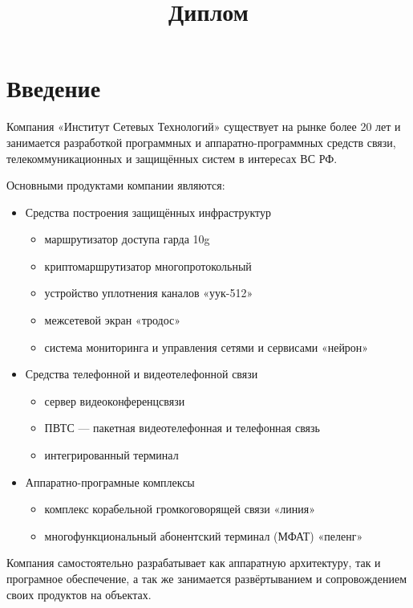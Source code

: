 \documentclass[14pt,a4paper]{extarticle}
\title{Диплом}
\begin{document}
\setcounter{page}{7}

\pagebreak
\tableofcontents

\pagebreak
\section*{Введение}


Компания «Институт Сетевых Технологий» существует на рынке более 20 лет и
занимается разработкой программных и аппаратно-программных средств связи,  телекоммуникационных и защищённых систем в интересах ВС РФ.

Основными продуктами компании являются:
\begin{itemize}
    \item Средства построения защищённых инфраструктур
    \begin{itemize}
        \item маршрутизатор доступа гарда 10g
        \item криптомаршрутизатор многопротокольный
        \item устройство уплотнения каналов «уук-512»
        \item межсетевой экран «тродос»
        \item система мониторинга и управления сетями и сервисами «нейрон»
    \end{itemize}
    \item Средства телефонной и видеотелефонной связи
    \begin{itemize}
        \item сервер видеоконференцсвязи
        \item ПВТС — пакетная видеотелефонная и телефонная связь
        \item интегрированный терминал
    \end{itemize}
    \item Аппаратно-програмные комплексы
    \begin{itemize}
        \item комплекс корабельной громкоговорящей связи «линия»
        \item многофункциональный абонентский терминал (МФАТ) «пеленг»
    \end{itemize}
\end{itemize}

Компания самостоятельно разрабатывает  как аппаратную  архитектуру, так и програмное обеспечение, а так же занимается развёртыванием и сопровождением своих продуктов на объектах.
\end{document}
